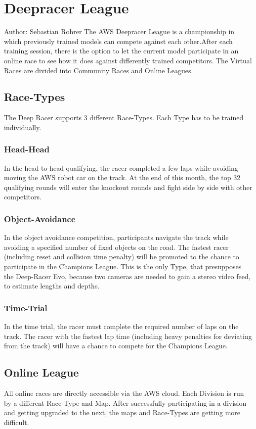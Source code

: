 \chapter{Deepracer League}
Author: Sebastian Rohrer\newline
The AWS Deepracer League is a championship in which previously trained models can compete against each other.After each training session, there is the option to let the current model participate in an online race to see how it does against differently trained competitors. The Virtual Races are divided into Community Races and Online Leagues.

\section{Race-Types}
The Deep Racer supports 3 different Race-Types. Each Type has to be trained individually.

\subsection{Head-Head}
In the head-to-head qualifying, the racer completed a few laps while avoiding moving the AWS robot car on the track. At the end of this month, the top 32 qualifying rounds will enter the knockout rounds and fight side by side with other competitors.

\subsection{Object-Avoidance}
In the object avoidance competition, participants navigate the track while avoiding a specified number of fixed objects on the road. The fastest racer (including reset and collision time penalty) will be promoted to the chance to participate in the Champions League. This is the only Type, that presupposes the Deep-Racer Evo, because two cameras are needed to gain a stereo video feed, to estimate lengths and depths.

\subsection{Time-Trial}
In the time trial, the racer must complete the required number of laps on the track. The racer with the fastest lap time (including heavy penalties for deviating from the track) will have a chance to compete for the Champions League.

\section{Online League}
All online races are directly accessible via the AWS cloud. Each Division is run by a different Race-Type and Map. After successfully participating in a division and getting upgraded to the next, the maps and Race-Types are getting more difficult.


